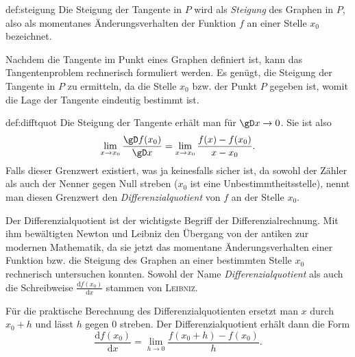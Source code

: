 \documentclass[%
11pt,%
twoside,%
titlepage,%
german,%
headsepline%
]{scrartcl}
\begin{document}
\pagebreak

\begin{cdef}[Steigung]{def:steigung}
Die Steigung der Tangente in $P$ wird als \emph{Steigung} des Graphen in $P$, also als momentanes \"Anderungsverhalten der Funktion $f$ an einer Stelle $x_0$ bezeichnet.
\end{cdef}

Nachdem die Tangente im Punkt eines Graphen definiert ist, kann das Tangentenproblem rechnerisch formuliert werden. Es gen\"ugt, die Steigung der Tangente in $P$ zu ermitteln, da die Stelle $x_0$ bzw. der Punkt $P$ gegeben ist, womit die Lage der Tangente eindeutig bestimmt ist.

\begin{cdef}[Differenzialquotient]{def:difftquot}
Die Steigung der Tangente erh\"alt man f\"ur $\gD x\rightarrow0$. Sie ist also
$$\lim_{x\rightarrow x_0}\frac{\gD f(x_0)}{\gD x}=\lim_{x\rightarrow x_0}\frac{f(x)-f(x_0)}{x-x_0}.$$
Falls dieser Grenzwert existiert, was ja keinesfalls sicher ist, da sowohl der Z\"ahler als auch der Nenner gegen Null streben ($x_0$ ist eine Unbestimmtheitsstelle), nennt man diesen Grenzwert den \emph{Differenzialquotient} von $f$ an der Stelle $x_0$.
\end{cdef}

Der Differenzialquotient ist der wichtigste Begriff der Differenzialrechnung. Mit ihm bew\"altigten Newton und Leibniz den \"Ubergang von der antiken zur modernen Mathematik, da sie jetzt das momentane \"Anderungsverhalten einer Funktion bzw. die Steigung des Graphen an einer bestimmten Stelle $x_0$ rechnerisch untersuchen konnten.
Sowohl der Name \emph{Differenzialquotient} als auch die Schreibweise $\frac{\mathrm{d}f(x_0)}{\mathrm{d}x}$ stammen von \textsc{Leibniz}.

F\"ur die praktische Berechnung des Differenzialquotienten ersetzt man $x$ durch $x_0+h$ und l\"asst $h$ gegen $0$ streben. Der Differenzialquotient erh\"alt dann die Form
$$\frac{\mathrm{d}f(x_0)}{\mathrm{d}x}=\lim_{h\rightarrow0}\frac{f(x_0+h)-f(x_0)}{h}.$$
\end{document}
